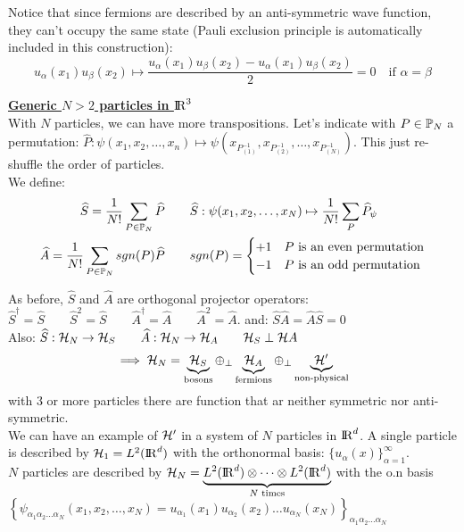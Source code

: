 Notice that since fermions are described by an anti-symmetric wave function, they can't occupy the same state (Pauli exclusion principle is automatically included in this construction):
$$u_\alpha(x_1) u_\beta(x_2) \mapsto \frac{u_\alpha(x_1) u_\beta(x_2) - u_\alpha(x_1) u_\beta(x_2)}2  = 0 \quad \text{if } \alpha = \beta$$

\vspace{10pt}
\underline{\textbf{Generic $N>2$ particles in ${\rm I\!R}^3$}}\\
With $N$ particles, we can have more transpositions. Let's indicate with $P \in \mathbb{P}_N$ a permutation: $\widehat P : \psi(x_1,x_2,\dots,x_n) \mapsto \psi\left(x_{P^{-1}_{(1)}}, x_{P^{-1}_{(2)}}, \dots, x_{P^{-1}_{(N)}}\right)$. This just re-shuffle the order of particles.\\
We define: 
\begin{align*}
    \widehat S = \frac1{N!} \sum_{P\in\mathbb{P}_N} \widehat P \qquad &\widehat S : \psi(x_1,x_2,\dots,x_N) \mapsto \frac1{N!} \sum_P \widehat P_\psi \\
    \widehat A = \frac1{N!} \sum_{P\in\mathbb{P}_N} sgn(P) \widehat P \qquad & sgn(P) = \begin{cases}
        +1 & \text{$P$ is an even permutation} \\
        -1 & \text{$P$ is an odd permutation}
    \end{cases}
\end{align*}

As before, $\widehat S$ and $\widehat A$ are orthogonal projector operators:\\
$\widehat S^\dag = \widehat S \qquad \widehat S^2 = \widehat S \qquad \widehat A^\dag = \widehat A \qquad \widehat A^2 = \widehat A$. \qquad and: $\widehat S\widehat A = \widehat A\widehat S = 0$\\
Also: $\widehat S : \mathcal{H}_N \to \mathcal{H}_S \qquad \widehat A : \mathcal{H}_N \to \mathcal{H}_A \qquad \mathcal{H}_S \perp \mathcal{H} A $\\
$$\implies \mathcal{H}_N = \underbrace{\mathcal{H}_S}_{\text{bosons}} \oplus_\perp \underbrace{\mathcal{H}_A}_{\text{fermions}} \oplus_\perp \underbrace{\mathcal{H}'}_{\text{non-physical}} $$
with 3 or more particles there are function that ar neither symmetric nor anti-symmetric.\\

We can have an example of $\mathcal{H}'$ in a system of $N$ particles in ${\rm I\!R}^d$. A single particle is described by $\mathcal{H}_1 = L^2({\rm I\!R}^d)$ with the orthonormal basis: $\{ u_\alpha(x)\}_{\alpha = 1}^\infty$.\\
$N$ particles are described by $\mathcal{H}_N = \underbrace{L^2({\rm I\!R}^d) \otimes \dots \otimes L^2({\rm I\!R}^d)}_{\text{$N$ times}}$ with the o.n basis\\ 
$\left\{ \psi_{\alpha_1\alpha_2\dots \alpha_N}(x_1,x_2,\dots,x_N) = u_{\alpha_1}(x_1) u_{\alpha_2}(x_2)\dots u_{\alpha_N}(x_N) \right\}_{\alpha_1\alpha_2\dots\alpha_N}$ \\

